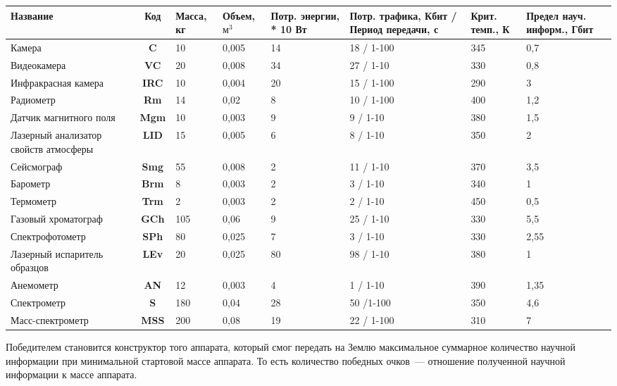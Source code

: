 \documentclass[12pt,a4paper]{article}
\begin{document}
\begin{center}
\begin{longtable}{ |p{3cm}|c|p{1.5cm}|p{1.5cm}|p{1.5cm}|p{2cm}|p{1.5cm}|p{1.5cm}| } 
  \hline
  \textbf{Название} & \textbf{Код} & \textbf{Масса, кг} & \textbf{Объем, $\text{м}^3$} &
  \textbf{Потр. энергии, * 10 Вт} & \textbf{Потр. трафика, Кбит / Период передачи,
    с} & \textbf{Крит. темп., К} & \textbf{Предел науч. информ., Гбит}\\
  \hline
  \endhead
  Камера & \textbf{C} & 10 & 0,005 & 14 & 18 / 1-100 & 345 & 0,7\\
  \hline
  Видеокамера & \textbf{VC} & 20 & 0,008 & 34 & 27 / 1-10 & 330 & 0,8\\
  \hline
  Инфракрасная камера & \textbf{IRC} & 10 & 0,004 & 20 & 15 / 1-100 & 290 & 3\\ 
  \hline
  Радиометр & \textbf{Rm} & 14 & 0,02 & 8 & 10 / 1-100 & 400 & 1,2\\
  \hline
  Датчик магнитного поля & \textbf{Mgm} & 10 & 0,003 & 9 & 9 / 1-10 & 380 & 1,5\\ 
  \hline
  Лазерный анализатор свойств атмосферы & \textbf{LID} & 15 & 0,005 & 6 & 8 / 1-10 & 350 &
  2\\
  \hline
  Сейсмограф & \textbf{Smg} & 55 & 0,008 & 2 & 11 / 1-10 & 370 & 3,5\\
  \hline
  Барометр & \textbf{Brm} & 8 & 0,003 & 2 & 3 / 1-10 & 340 & 1\\
  \hline
  Термометр & \textbf{Trm} & 2 & 0,003 & 2 & 2 / 1-10 & 450 & 0,5\\
  \hline
  Газовый хроматограф & \textbf{GCh} & 105 & 0,06 & 9 & 25 / 1-10 & 330 & 5,5\\
  \hline
  Спект\-ро\-фо\-то\-метр & \textbf{SPh} & 80 & 0,025 & 7 & 3 / 1-10 & 330 & 2,55\\
  \hline
  Лазерный испаритель образцов & \textbf{LEv} & 20 & 0,025 & 80 & 98 / 1-10 & 380 & 1\\
  \hline
  Анемометр & \textbf{AN} & 12 & 0,003 & 4 & 1 / 1-10 & 390 & 1,35 \\
  \hline
  Спектрометр & \textbf{S} & 180 & 0,04 & 28 & 50 /1-100 & 350 & 4,6\\
  \hline
  Масс-спектрометр & \textbf{MSS} & 200 & 0,08 & 19 & 22 / 1-100 & 310 & 7\\
  \hline
\end{longtable}
\end{center}

Победителем становится конструктор того аппарата, который смог передать на Землю
максимальное суммарное количество научной информации при минимальной стартовой массе
аппарата. То есть количество победных очков~--- отношение полученной научной информации к
массе аппарата.
\end{document}
